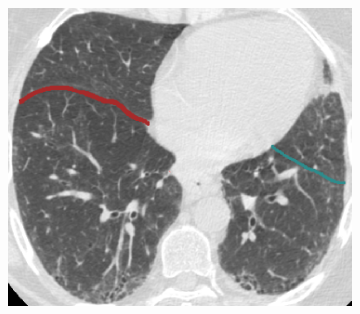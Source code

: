 {\begin{figure}[htbp]
\begin{subfigure}{.32\linewidth}%
  \includegraphics[width=\linewidth,trim={{.0\wd0} {.0\wd0} {.0\wd0} {.0\wd0}},clip]{Segmentation/Image/IPF203_FinalResult_Axial125.png}
  \caption{}
  \label{fig:IPFSegmentationResults-f} 
\end{subfigure}
\begin{subfigure}{.32\linewidth}%

\end{subfigure}
\end{figure}}
